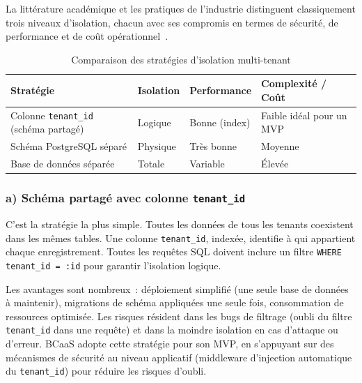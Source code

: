 La littérature académique et les pratiques de l'industrie distinguent classiquement trois
niveaux d'isolation, chacun avec ses compromis en termes de sécurité, de performance et
de coût opérationnel~\cite{strategies}.

\begin{table}[ht]
  \centering
  \caption{Comparaison des stratégies d'isolation multi-tenant}
  \label{tab:multitenant}
  \renewcommand{\arraystretch}{1.3}
  \begin{tabularx}{\textwidth}{>{\raggedright\arraybackslash}X
                               >{\centering\arraybackslash}p{2.2cm}
                               >{\centering\arraybackslash}p{2.4cm}
                               >{\raggedright\arraybackslash}X}
    \toprule
    \textbf{Stratégie} & \textbf{Isolation} & \textbf{Performance} & \textbf{Complexité / Coût} \\
    \midrule
    Colonne \texttt{tenant\_id} (schéma partagé)
      & Logique   & Bonne (index)  & Faible idéal pour un MVP \\
    Schéma PostgreSQL séparé
      & Physique  & Très bonne     & Moyenne \\
    Base de données séparée
      & Totale    & Variable       & Élevée \\
    \bottomrule
  \end{tabularx}
\end{table}

\subsubsection*{a) Schéma partagé avec colonne \texttt{tenant\_id}}

C'est la stratégie la plus simple. Toutes les données de tous les tenants coexistent dans
les mêmes tables. Une colonne \texttt{tenant\_id}, indexée, identifie à qui appartient
chaque enregistrement. Toutes les requêtes SQL doivent inclure un filtre
\texttt{WHERE tenant\_id = :id} pour garantir l'isolation logique.

Les avantages sont nombreux~: déploiement simplifié (une seule base de données à
maintenir), migrations de schéma appliquées une seule fois, consommation de ressources
optimisée. Les risques résident dans les bugs de filtrage (oubli du filtre
\texttt{tenant\_id} dans une requête) et dans la moindre isolation en cas d'attaque ou
d'erreur. BCaaS adopte cette stratégie pour son MVP, en s'appuyant sur des mécanismes de
sécurité au niveau applicatif (middleware d'injection automatique du \texttt{tenant\_id})
pour réduire les risques d'oubli.

